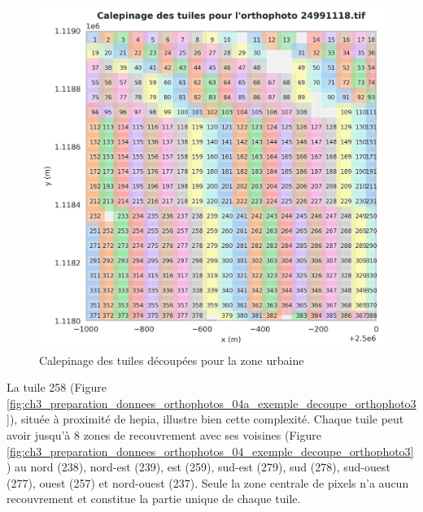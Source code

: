 \begin{figure}[H]
    \centering
    \includegraphics[width=1\linewidth]{02-main/figures/ch3/ch3_preparation_donnees_orthophotos_03_exemple_decoupe_orthophoto2.png}
    \caption{Calepinage des tuiles découpées pour la zone urbaine}
    \label{fig:ch3_preparation_donnees_orthophotos_03_exemple_decoupe_orthophoto2}
\end{figure}

\newpage
La tuile 258 (Figure \ref{fig:ch3_preparation_donnees_orthophotos_04a_exemple_decoupe_orthophoto3}), située à proximité de \acrshort{hepia}, illustre bien cette complexité. Chaque tuile peut avoir jusqu'à 8 zones de recouvrement avec ses voisines (Figure \ref{fig:ch3_preparation_donnees_orthophotos_04_exemple_decoupe_orthophoto3}) au nord (238), nord-est (239), est (259), sud-est (279), sud (278), sud-ouest (277), ouest (257) et nord-ouest (237). Seule la zone centrale de \si{}  pixels n'a aucun recouvrement et constitue la partie unique de chaque tuile.

